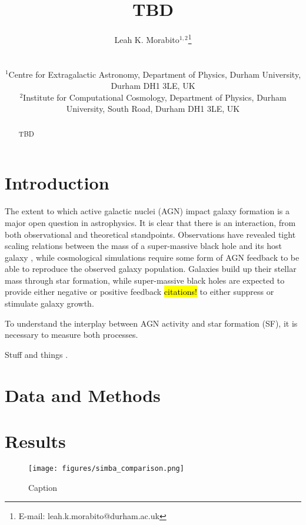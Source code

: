 \documentclass[usenatbib,fleqn]{mnras}
\title[TBD]{TBD}
\author[L.K. Morabito]{\parbox{\textwidth}{Leah K. Morabito$^{1,2}$\thanks{E-mail: leah.k.morabito@durham.ac.uk}\orcidlink{0000-0003-0487-6651}\\}\\ 
$^{1}$Centre for Extragalactic Astronomy, Department of Physics, Durham University, Durham DH1 3LE, UK \\
$^{2}$Institute for Computational Cosmology, Department of Physics, Durham University, South Road, Durham DH1 3LE, UK \\ }
\begin{document}
\date{}
\pagerange{\pageref{firstpage}--\pageref{lastpage}} 
\maketitle

\label{firstpage}


\begin{abstract}
    TBD
\end{abstract}

\section{Introduction}
\label{sec:intro}
The extent to which active galactic nuclei (AGN) impact galaxy formation is a major open question in astrophysics. It is clear that there is an interaction, from both observational and theoretical standpoints. Observations have revealed tight scaling relations between the mass of a super-massive black hole and its host galaxy \citep[see, e.g.][and references therein]{kormendy_coevolution_2013}, while cosmological simulations require some form of AGN feedback \citep{bower_breaking_2006,croton_many_2006} to be able to reproduce the observed galaxy population. Galaxies build up their stellar mass through star formation, while super-massive black holes are expected to provide either negative or positive feedback \hl{citations!} to either suppress or stimulate galaxy growth. 

To understand the interplay between AGN activity and star formation (SF), it is necessary to measure both processes. 

Stuff and things \citep{morabito_sub-arcsecond_2022}.

\section{Data and Methods}



\section{Results}

\begin{figure}
    \centering
    \texttt{[image: figures/simba\_comparison.png]}
    \caption{Caption}
    \label{fig:simba}
\end{figure}
\end{document}
